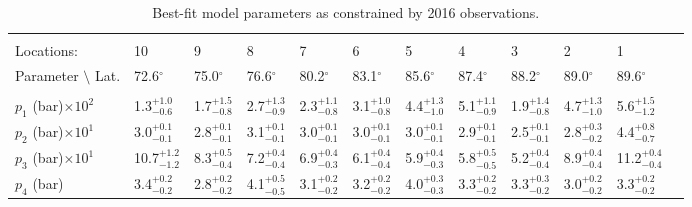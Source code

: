 \documentclass[article,11pt]{emulateapj}
\def\degx{$^\circ$}
\begin{document}
\begin{table*}[!htb]\centering
\caption{Best-fit model parameters as constrained by 2016 observations.}
\begin{scriptsize}
\setlength\tabcolsep{2pt}
\begin{tabular}{l l l l l l l l l l l l}
\hline\\[-0.05in]
Locations:&                  10&                   9&                   8&                   7&                   6&                   5&                   4&                   3&                   2&                   1\\[0.05in]
Parameter $\setminus$ Lat. &           72.6\degx  &          75.0\degx  &          76.6\degx  &          80.2\degx  &          83.1\degx  &          85.6\degx  &          87.4\degx  &          88.2\degx  &          89.0\degx &          89.6\degx \\[0.05in]
\hline\\[-0.05in]
 $p_1$ (bar)$\times 10^2$ &   1.3$^{+  1.0}_{-  0.6}$ &   1.7$^{+  1.5}_{-  0.8}$ &   2.7$^{+  1.3}_{-  0.9}$ &   2.3$^{+  1.1}_{-  0.8}$ &   3.1$^{+  1.0}_{-  0.8}$ &   4.4$^{+  1.3}_{-  1.0}$ &   5.1$^{+  1.1}_{-  0.9}$ &   1.9$^{+  1.4}_{-  0.8}$ &   4.7$^{+  1.3}_{-  1.0}$ &   5.6$^{+  1.5}_{-  1.2}$\\[0.05in]
 $p_2$ (bar)$\times 10^1$ &   3.0$^{+  0.1}_{-  0.1}$ &   2.8$^{+  0.1}_{-  0.1}$ &   3.1$^{+  0.1}_{-  0.1}$ &   3.0$^{+  0.1}_{-  0.1}$ &   3.0$^{+  0.1}_{-  0.1}$ &   3.0$^{+  0.1}_{-  0.1}$ &   2.9$^{+  0.1}_{-  0.1}$ &   2.5$^{+  0.1}_{-  0.1}$ &   2.8$^{+  0.3}_{-  0.2}$ &   4.4$^{+  0.8}_{-  0.7}$\\[0.05in]
 $p_3$ (bar)$\times 10^1$ &  10.7$^{+  1.2}_{-  1.2}$ &   8.3$^{+  0.5}_{-  0.4}$ &   7.2$^{+  0.4}_{-  0.4}$ &   6.9$^{+  0.4}_{-  0.3}$ &   6.1$^{+  0.4}_{-  0.4}$ &   5.9$^{+  0.4}_{-  0.3}$ &   5.8$^{+  0.5}_{-  0.5}$ &   5.2$^{+  0.4}_{-  0.4}$ &   8.9$^{+  0.4}_{-  0.4}$ &  11.2$^{+  0.4}_{-  0.4}$\\[0.05in]
              $p_4$ (bar) &   3.4$^{+  0.2}_{-  0.2}$ &   2.8$^{+  0.2}_{-  0.2}$ &   4.1$^{+  0.5}_{-  0.5}$ &   3.1$^{+  0.2}_{-  0.2}$ &   3.2$^{+  0.2}_{-  0.2}$ &   4.0$^{+  0.3}_{-  0.3}$ &   3.3$^{+  0.2}_{-  0.2}$ &   3.3$^{+  0.3}_{-  0.2}$ &   3.0$^{+  0.2}_{-  0.2}$ &   3.3$^{+  0.2}_{-  0.2}$\\[0.05in]

\end{tabular}
\end{scriptsize}
\end{table*}
\end{document}
